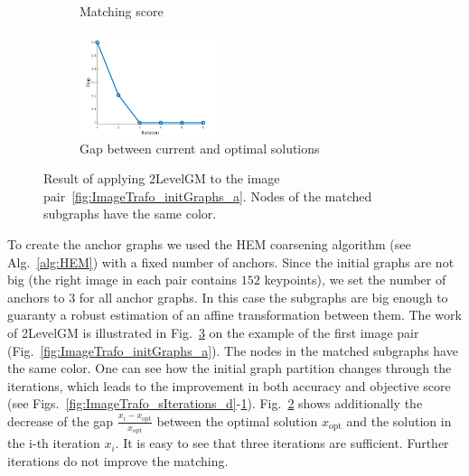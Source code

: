 \begin{figure}
\begin{center}
\begin{subfigure}[t]{0.33\textwidth}
			\caption{Matching score\hspace{5pt}}
			\label{fig:ImageTrafo_sIterations_e}
		\end{subfigure}
		\begin{subfigure}[t]{0.3\textwidth}
			\includegraphics[width=4cm]{"chapter3/fig/ImageTrafo/sIterations/gap"}
			\caption{Gap between current and optimal solutions}
			\label{fig:ImageTrafo_sIterations_f}
		\end{subfigure} 	
	\end{center}		
	\caption[Result of applying 2LevelGM to the image pair~\ref{fig:ImageTrafo_initGraphs_a}]{Result of applying 2LevelGM to the image pair~\ref{fig:ImageTrafo_initGraphs_a}. Nodes of the matched subgraphs have the same color.}
	\label{fig:ImageTrafo_sIterations}
\end{figure}

To create the anchor graphs we used the HEM coarsening algorithm (see Alg.~\ref{alg:HEM}) with a fixed number of anchors. Since the initial graphs are not big (the right image in each pair contains $152$ keypoints), we set the number of anchors to $3$ for all anchor graphs. In this case the subgraphs are big enough to guaranty a robust estimation of an affine transformation between them. The work of 2LevelGM is illustrated in Fig.~\ref{fig:ImageTrafo_sIterations} on the example of the first image pair (Fig.~\ref{fig:ImageTrafo_initGraphs_a}). The nodes in the matched subgraphs have the same color. One can see how the initial graph partition changes through the iterations, which leads to the improvement in both accuracy and objective score (see Figs.~\ref{fig:ImageTrafo_sIterations_d}-\ref{fig:ImageTrafo_sIterations_e}). Fig.~\ref{fig:ImageTrafo_sIterations_f} shows additionally the decrease of the gap $\frac{x_i-x_{\text{opt}}}{x_{\text{opt}}}$ between the optimal solution $x_{\text{opt}}$ and the solution in the i-th iteration $x_i$. It is easy to see that three iterations are sufficient. Further iterations do not improve the matching.

